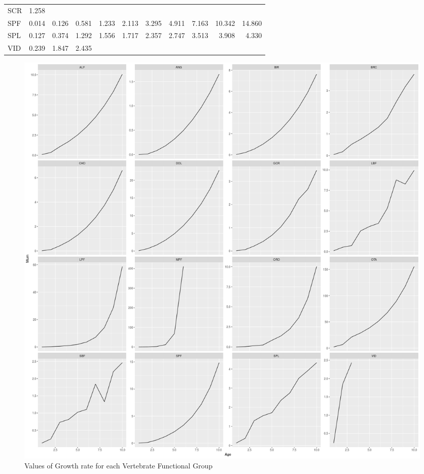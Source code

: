 \documentclass[11pt]{article}
\begin{document}
\begin{itemize}
\begin{itemize}
\begin{table}[htb]
\begin{center}
\begin{tabular}{lrrrrrrrrrr}
 SCR  &  1.258  &         &          &          &          &           &          &          &           &           \\
 SPF  &  0.014  &  0.126  &   0.581  &   1.233  &   2.113  &    3.295  &   4.911  &   7.163  &   10.342  &   14.860  \\
 SPL  &  0.127  &  0.374  &   1.292  &   1.556  &   1.717  &    2.357  &   2.747  &   3.513  &    3.908  &    4.330  \\
 VID  &  0.239  &  1.847  &   2.435  &          &          &           &          &          &           &           \\
\end{tabular}
\end{center}
\end{table}


    \begin{figure}[htb]
    \centering
    \includegraphics[width=.9\linewidth]{img/mum.png}
    \caption{Values of Growth rate for each Vertebrate Functional Group}
    \end{figure}
\end{itemize}


\end{itemize}
\end{document}
